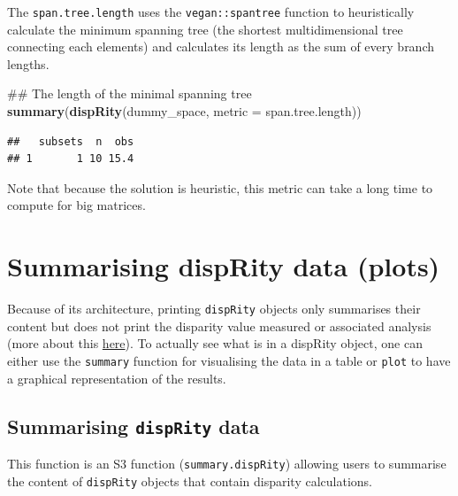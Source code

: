 \documentclass[]{book}
\newenvironment{Shaded}{\begin{snugshade}}{\end{snugshade}}
\newcommand{\KeywordTok}[1]{\textcolor[rgb]{0.13,0.29,0.53}{\textbf{#1}}}
\newcommand{\DataTypeTok}[1]{\textcolor[rgb]{0.13,0.29,0.53}{#1}}
\newcommand{\NormalTok}[1]{#1}
\theoremstyle{definition}
\theoremstyle{definition}
\theoremstyle{remark}
\begin{document}
The \texttt{span.tree.length} uses the \texttt{vegan::spantree} function
to heuristically calculate the minimum spanning tree (the shortest
multidimensional tree connecting each elements) and calculates its
length as the sum of every branch lengths.

\begin{Shaded}
\begin{Highlighting}[]
\NormalTok{## The length of the minimal spanning tree}
\KeywordTok{summary}\NormalTok{(}\KeywordTok{dispRity}\NormalTok{(dummy_space, }\DataTypeTok{metric =}\NormalTok{ span.tree.length))}
\end{Highlighting}
\end{Shaded}

\begin{verbatim}
##   subsets  n  obs
## 1       1 10 15.4
\end{verbatim}

Note that because the solution is heuristic, this metric can take a long
time to compute for big matrices.

\section{Summarising dispRity data
(plots)}\label{summarising-disprity-data-plots}

Because of its architecture, printing \texttt{dispRity} objects only
summarises their content but does not print the disparity value measured
or associated analysis (more about this
\protect\hyperlink{manipulating-dispRity-objects}{here}). To actually
see what is in a dispRity object, one can either use the
\texttt{summary} function for visualising the data in a table or
\texttt{plot} to have a graphical representation of the results.

\subsection{\texorpdfstring{Summarising \texttt{dispRity}
data}{Summarising dispRity data}}\label{summarising-disprity-data}

This function is an S3 function (\texttt{summary.dispRity}) allowing
users to summarise the content of \texttt{dispRity} objects that contain
disparity calculations.
\end{document}
